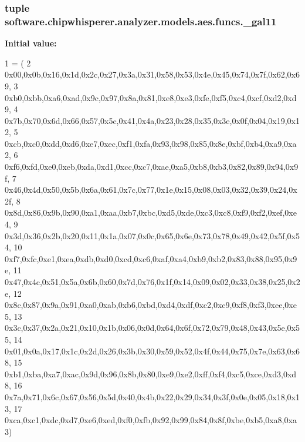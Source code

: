 \subsubsection[{\+\_\+gal11}]{\setlength{\rightskip}{0pt plus 5cm}tuple software.\+chipwhisperer.\+analyzer.\+models.\+aes.\+funcs.\+\_\+gal11}\label{namespacesoftware_1_1chipwhisperer_1_1analyzer_1_1models_1_1aes_1_1funcs_a526b4a460be415479454f3a77d495d27}
{\bfseries Initial value\+:}
\begin{DoxyCode}
1 = (
2 0x00,0x0b,0x16,0x1d,0x2c,0x27,0x3a,0x31,0x58,0x53,0x4e,0x45,0x74,0x7f,0x62,0x69,
3 0xb0,0xbb,0xa6,0xad,0x9c,0x97,0x8a,0x81,0xe8,0xe3,0xfe,0xf5,0xc4,0xcf,0xd2,0xd9,
4 0x7b,0x70,0x6d,0x66,0x57,0x5c,0x41,0x4a,0x23,0x28,0x35,0x3e,0x0f,0x04,0x19,0x12,
5 0xcb,0xc0,0xdd,0xd6,0xe7,0xec,0xf1,0xfa,0x93,0x98,0x85,0x8e,0xbf,0xb4,0xa9,0xa2,
6 0xf6,0xfd,0xe0,0xeb,0xda,0xd1,0xcc,0xc7,0xae,0xa5,0xb8,0xb3,0x82,0x89,0x94,0x9f,
7 0x46,0x4d,0x50,0x5b,0x6a,0x61,0x7c,0x77,0x1e,0x15,0x08,0x03,0x32,0x39,0x24,0x2f,
8 0x8d,0x86,0x9b,0x90,0xa1,0xaa,0xb7,0xbc,0xd5,0xde,0xc3,0xc8,0xf9,0xf2,0xef,0xe4,
9 0x3d,0x36,0x2b,0x20,0x11,0x1a,0x07,0x0c,0x65,0x6e,0x73,0x78,0x49,0x42,0x5f,0x54,
10 0xf7,0xfc,0xe1,0xea,0xdb,0xd0,0xcd,0xc6,0xaf,0xa4,0xb9,0xb2,0x83,0x88,0x95,0x9e,
11 0x47,0x4c,0x51,0x5a,0x6b,0x60,0x7d,0x76,0x1f,0x14,0x09,0x02,0x33,0x38,0x25,0x2e,
12 0x8c,0x87,0x9a,0x91,0xa0,0xab,0xb6,0xbd,0xd4,0xdf,0xc2,0xc9,0xf8,0xf3,0xee,0xe5,
13 0x3c,0x37,0x2a,0x21,0x10,0x1b,0x06,0x0d,0x64,0x6f,0x72,0x79,0x48,0x43,0x5e,0x55,
14 0x01,0x0a,0x17,0x1c,0x2d,0x26,0x3b,0x30,0x59,0x52,0x4f,0x44,0x75,0x7e,0x63,0x68,
15 0xb1,0xba,0xa7,0xac,0x9d,0x96,0x8b,0x80,0xe9,0xe2,0xff,0xf4,0xc5,0xce,0xd3,0xd8,
16 0x7a,0x71,0x6c,0x67,0x56,0x5d,0x40,0x4b,0x22,0x29,0x34,0x3f,0x0e,0x05,0x18,0x13,
17 0xca,0xc1,0xdc,0xd7,0xe6,0xed,0xf0,0xfb,0x92,0x99,0x84,0x8f,0xbe,0xb5,0xa8,0xa3)
\end{DoxyCode}
\hypertarget{namespacesoftware_1_1chipwhisperer_1_1analyzer_1_1models_1_1aes_1_1funcs_ae944000b9a17deee0b27e0ab298f72ee}{}
